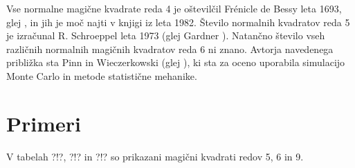 \documentclass[a4paper,12pt]{article}
\theoremstyle{definition}
\theoremstyle{plain}
\begin{document}
Vse normalne magične kvadrate reda 4 je oštevilčil Frénicle de Bessy
leta 1693, glej \cite{bessy}, in jih je moč najti v knjigi \cite{berlekamp}
iz leta 1982. Število normalnih kvadratov reda 5 je izračunal
R. Schroeppel leta 1973 (glej Gardner \cite{gardner}).
Natančno število vseh različnih normalnih magičnih kvadratov reda 6 ni znano.
Avtorja navedenega približka sta Pinn in Wieczerkowski (glej \cite{pinn}), ki
sta za oceno uporabila simulacijo Monte Carlo in metode statistične mehanike.


\section{Primeri}

V tabelah ?!?, ?!? in ?!? so prikazani
magični kvadrati redov 5, 6 in 9. %




\newpage




\end{document}
